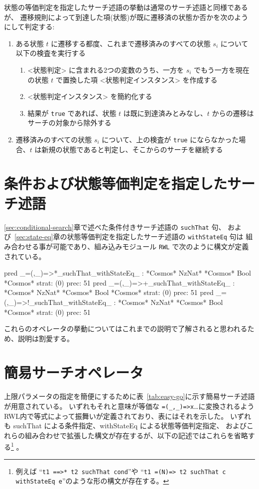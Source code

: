 \documentclass{article}
\begin{document}
状態の等価判定を指定したサーチ述語の挙動は通常のサーチ述語と同様であるが、
遷移規則によって到達した項(状態)が既に遷移済の状態か否かを次のようにして判定する:
\begin{enumerate}
\item ある状態 $t$ に遷移する都度、これまで遷移済みのすべての状態 $s_i$ について以下の検査を実行する
\begin{enumerate}
  \item <状態判定> に含まれる2つの変数のうち、一方を $s_i$ でもう一方を現在の状態 $t$ で置換した項 <状態判定インスタンス> を作成する
  \item <状態判定インスタンス> を簡約化する
  \item 結果が \texttt{true} であれば、状態 $t$ は既に到達済みとみなし、$t$ からの遷移はサーチの対象から除外する
\end{enumerate}

\item 遷移済みのすべての状態 $s_i$ について、上の検査が \texttt{true} にならなかった場合、$t$ は新規の状態であると判定し、そこからのサーチを継続する
\end{enumerate}

\section{条件および状態等価判定を指定したサーチ述語}
\label{sec:cond+state-eq}
\ref{sec:conditional-search}章で述べた条件付きサーチ述語の \texttt{suchThat} 句、
および~\ref{sec:state-eq}章の状態等価判定を指定したサーチ述語の \texttt{withStateEq} 句は%
組み合わせる事が可能であり、組み込みモジュール \texttt{RWL} で次のように構文が定義されている。

\begin{simplev}
 pred _=(,_)=>*_suchThat_withStateEq_ : *Cosmos* NzNat* *Cosmos* Bool *Cosmos*
      { strat: (0) prec: 51 }
 pred _=(,_)=>+_suchThat_withStateEq_ : *Cosmos* NzNat* *Cosmos* Bool *Cosmos*
      { strat: (0) prec: 51 }
 pred _=(,_)=>!_suchThat_withStateEq_ : *Cosmos* NzNat* *Cosmos* Bool *Cosmos*
      { strat: (0) prec: 51 }
\end{simplev}

これらのオペレータの挙動についてはこれまでの説明で了解されると思われるため、説明は割愛する。

\section{簡易サーチオペレータ}
上限パラメータの指定を簡便にするために表~\ref{tab:easy-go}に示す簡易サーチ述語が用意されている。
いずれもそれと意味が等価な \texttt{=(\_,\_)=>x}\ldots に変換されるようRWL内で等式によって振舞いが定義されており、表にはそれを示した。
いずれも suchThat による条件指定、withStateEq による状態等価判定指定、
およびこれらの組み合わせで拡張した構文が存在するが、以下の記述ではこれらを省略する\footnote{
  例えば ``\texttt{t1 ==>* t2 suchThat cond}''や ``\texttt{t1 =(N)=> t2 suchThat c withStateEq e}''のような形の構文が存在する。} 。
\end{document}
